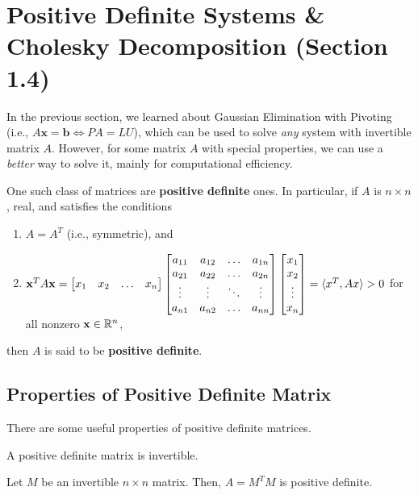\documentclass[letterpaper]{article}
\newcommand{\0}{\mathbf{0}}
\renewcommand{\b}{\mathbf{b}}
\newcommand{\x}{\mathbf{x}}
\begin{document}
\section{Positive Definite Systems \& Cholesky Decomposition (Section 1.4)}
In the previous section, we learned about Gaussian Elimination with Pivoting (i.e., $A\x = \b \iff PA = LU$), which can be used to solve \emph{any} system with invertible matrix $A$. However, for some matrix $A$ with special properties, we can use a \emph{better} way to solve it, mainly for computational efficiency.  

\bigskip 

One such class of matrices are \textbf{positive definite} ones. In particular, if $A$ is $n \times n$, real, and satisfies the conditions 
\begin{enumerate}
    \item $A = A^T$ (i.e., symmetric), and 
    \item $\x^T A \x = \begin{bmatrix}
        x_1 & x_2 & \hdots & x_n
    \end{bmatrix} \begin{bmatrix}
        a_{11} & a_{12} & \hdots & a_{1n} \\ 
        a_{21} & a_{22} & \hdots & a_{2n} \\ 
        \vdots & \vdots & \ddots & \vdots \\ 
        a_{n1} & a_{n2} & \hdots & a_{nn}
    \end{bmatrix} \begin{bmatrix}
        x_1 \\ x_2 \\ \vdots \\ x_n
    \end{bmatrix} = \cyclic{x^T, Ax} > 0$ for all nonzero $\x \in \R^n$, 
\end{enumerate}
then $A$ is said to be \textbf{positive definite}. 

\subsection{Properties of Positive Definite Matrix}
There are some useful properties of positive definite matrices. 

\begin{lemma}{}{}
    A positive definite matrix is invertible. 
\end{lemma}

\begin{theorem}{}{}
    Let $M$ be an invertible $n \times n$ matrix. Then, $A = M^T M$ is positive definite.  
\end{theorem}
\end{document}
